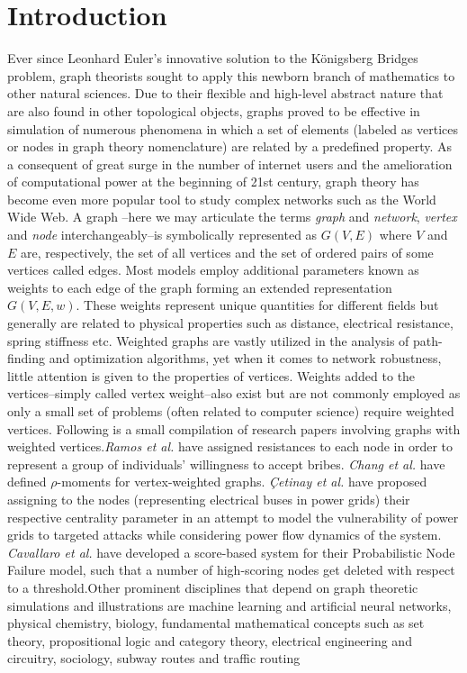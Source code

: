 \documentclass{article}
\begin{document}
	\section{Introduction}
	Ever since Leonhard Euler's innovative solution to the K\"{o}nigsberg Bridges problem, graph theorists sought to apply this newborn branch of mathematics to other natural sciences. Due to their flexible and high-level abstract nature that are also found in other topological objects, graphs proved to be effective in simulation of numerous phenomena in which a set of elements (labeled as vertices or nodes in graph theory nomenclature) are related by a predefined property\cite{tucker2012applied}. As a consequent of great surge in the number of internet users and the amelioration of computational power at the beginning of 21st century, graph theory has become even more popular tool to study complex networks such as the World Wide Web\cite{albert2000error}. A graph --here we may articulate the terms \textit{graph} and \textit{network}, \textit{vertex} and \textit{node} interchangeably--is symbolically represented as $G(V,E)$ where $V$ and $E$ are, respectively, the set of all vertices and the set of ordered pairs of some vertices called edges. Most models employ additional parameters known as weights to each edge of the graph forming an extended representation $G(V,E,w)$. These weights represent unique quantities for different fields but generally are related to physical properties such as distance, electrical resistance, spring stiffness etc. Weighted graphs are vastly utilized in the analysis of path-finding and optimization algorithms, yet when it comes to network robustness, little attention is given to the properties of vertices. Weights added to the vertices--simply called vertex weight--also exist but are not commonly employed as only a small set of problems (often related to computer science) require weighted vertices. Following is a small compilation of research papers involving graphs with weighted vertices.\newline \textit{Ramos et al.}\cite{ramos2021node} have assigned resistances to each node in order to represent a group of individuals' willingness to accept bribes. \textit{Chang et al.}\cite{chang2021rho} have defined $\rho$-moments for vertex-weighted graphs. \textit{\c{C}etinay et al.}\cite{cetinay2018nodal} have proposed assigning to the nodes (representing electrical buses in power grids) their respective centrality parameter in an attempt to model the vulnerability of power grids to targeted attacks while considering power flow dynamics of the system. \textit{Cavallaro et al.}\cite{ProbabNodeFailure} have developed a score-based system for their Probabilistic Node Failure model, such that a number of high-scoring nodes get deleted with respect to a threshold.\newline Other prominent disciplines that depend on graph theoretic simulations and illustrations are machine learning and artificial neural networks, physical chemistry\cite{klein1993m}, biology\cite{mason2007graph}\cite{knisley2014vertex}, fundamental mathematical concepts such as set theory, propositional logic and category theory, electrical engineering and circuitry, sociology, subway routes and traffic routing 
\end{document}
